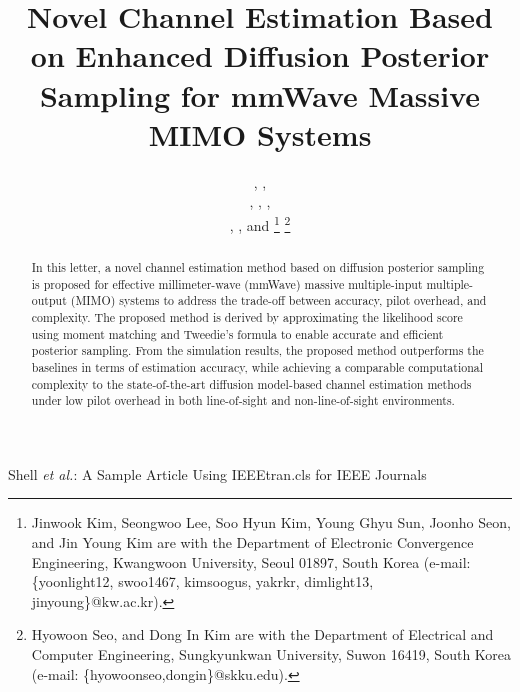 \documentclass[lettersize,journal]{IEEEtran}
\begin{document}
\title{Novel Channel Estimation Based on Enhanced Diffusion Posterior Sampling for mmWave Massive MIMO Systems}

\author{,  ,

, ,
,

, , and 
\thanks{Jinwook Kim, Seongwoo Lee, Soo Hyun Kim, Young Ghyu Sun, Joonho Seon, and Jin Young Kim are with the Department of Electronic Convergence Engineering, Kwangwoon University, Seoul 01897, South Korea (e-mail: \{yoonlight12, swoo1467, kimsoogus, yakrkr, dimlight13, jinyoung\}@kw.ac.kr).}
\thanks{Hyowoon Seo, and Dong In Kim are with the Department of Electrical and Computer Engineering, Sungkyunkwan University, Suwon 16419, South Korea (e-mail: \{hyowoonseo,dongin\}@skku.edu).}}


%
{Shell \MakeLowercase{\textit{et al.}}: A Sample Article Using IEEEtran.cls for IEEE Journals}

\maketitle
\begin{abstract}
In this letter, a novel channel estimation method based on diffusion posterior sampling is proposed for effective millimeter-wave (mmWave) massive multiple-input multiple-output (MIMO) systems to address the trade-off between accuracy, pilot overhead, and complexity. The proposed method is derived by approximating the likelihood score using moment matching and Tweedie's formula to enable accurate and efficient posterior sampling. From the simulation results, the proposed method outperforms the baselines in terms of estimation accuracy, while achieving a comparable computational complexity to the state-of-the-art diffusion model-based channel estimation methods under low pilot overhead in both line-of-sight and non-line-of-sight environments.
\end{abstract}
\end{document}
